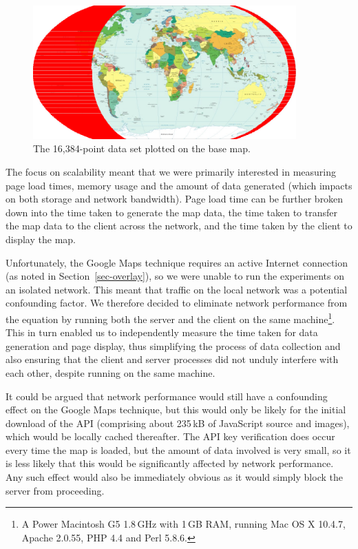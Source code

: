 \documentclass[acmnow]{acmtrans2m}
\begin{document}
\begin{figure}
	\centering
	\includegraphics[width=0.9\textwidth,keepaspectratio]{16384_points}
	\caption{The 16,384-point data set plotted on the base map.}
	\label{fig-grid-points}
\end{figure}


The focus on scalability meant that we were primarily interested in
measuring page load times, memory usage and the amount of data
generated (which impacts on both storage and network bandwidth). Page
load time can be further broken down into the time taken to generate the
map data, the time taken to transfer the map data to the client across
the network, and the time taken by the client to display the map.

Unfortunately, the Google Maps technique requires an active Internet
connection (as noted in Section~\ref{sec-overlay}), so we were unable to
run the experiments on an isolated network. This meant that traffic on
the local network was a potential confounding factor. We therefore
decided to eliminate network performance from the equation by running
both the server and the client on the same machine\footnote{A Power
Macintosh G5 1.8\,GHz with 1\,GB RAM, running Mac OS X 10.4.7, Apache
2.0.55, PHP 4.4 and Perl 5.8.6.}. This in turn enabled us to
independently measure the time taken for data generation and page
display, thus simplifying the process of data collection and also
ensuring that the client and server processes did not unduly interfere
with each other, despite running on the same machine.

It could be argued that network performance would still have a
confounding effect on the Google Maps technique, but this would only be
likely for the initial download of the API (comprising about 235\,kB of
JavaScript source and images), which would be locally cached thereafter.
The API key verification does occur every time the map is loaded, but
the amount of data involved is very small, so it is less likely that
this would be significantly affected by network performance. Any such
effect would also be immediately obvious as it would simply block the
server from proceeding.
\end{document}
